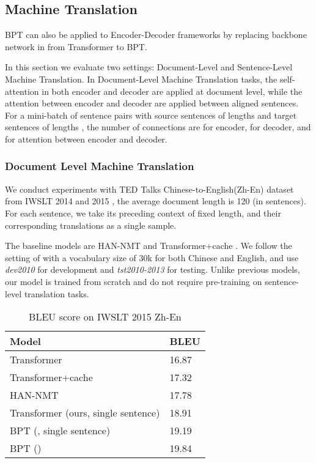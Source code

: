 \documentclass[11pt,a4paper]{article}
\begin{document}
\subsection{Machine Translation}

BPT can also be applied to Encoder-Decoder frameworks by replacing backbone network in \citet{vaswani2017attention} from Transformer to BPT.

In this section we evaluate two settings: Document-Level and Sentence-Level Machine Translation. In Document-Level Machine Translation tasks, the self-attention in both encoder and decoder are applied at document level, while the attention between encoder and decoder are applied between aligned sentences. For a mini-batch of sentence pairs with source sentences of lengths  and target sentences of lengths , the number of connections are  for encoder,  for decoder, and  for attention between encoder and decoder.

\subsubsection{Document Level Machine Translation}

We conduct experiments with TED Talks Chinese-to-English(Zh-En) dataset from IWSLT 2014 and 2015 \citep{cettolo2012wit3, cettolo2016iwslt}, the average document length is 120 (in sentences). For each sentence, we take its preceding context of fixed length, and their corresponding translations as a single sample.

The baseline models are HAN-NMT \cite{miculicich-etal-2018-document} and  Transformer+cache \cite{tu2018learning}. We follow the setting of \citet{miculicich-etal-2018-document} with a vocabulary size of 30k for both Chinese and English, and use \textit{dev2010} for development and \textit{tst2010-2013} for testing. Unlike previous models, our model is trained from scratch and do not require pre-training on sentence-level translation tasks.

\begin{table}[!htb]
\small
\centering
\begin{tabular}{ll}
\toprule
Model                         & BLEU  \\
\midrule
Transformer \cite{vaswani2017attention} & 16.87 \\
Transformer+cache \cite{tu2018learning} & 17.32 \\
HAN-NMT \cite{miculicich-etal-2018-document} & 17.78 \\
\midrule
Transformer (ours, single sentence) & 18.91 \\
BPT (, single sentence) & 19.19 \\
BPT () & 19.84 \\
\bottomrule
\end{tabular}
\caption{BLEU score on IWSLT 2015 Zh-En}
\label{tbl:doc-mt}
\end{table}
\end{document}
